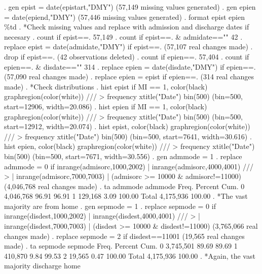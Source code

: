 . gen epist = date(epistart,"DMY")
(57,149 missing values generated)
{\smallskip}
. gen epien = date(epiend,"DMY")
(57,446 missing values generated)
{\smallskip}
. format epist epien \%td
{\smallskip}
. *Check missing values and replace with admission and discharge dates if necesary
. count if epist==.
  57,149
{\smallskip}
. count if epist==. \& admidate==""
  42
{\smallskip}
. replace epist = date(admidate,"DMY") if epist==.
(57,107 real changes made)
{\smallskip}
. drop if epist==.
(42 observations deleted)
{\smallskip}
. count if epien==.
  57,404
{\smallskip}
. count if epien==. \& disdate==""
  314
{\smallskip}
. replace epien = date(disdate,"DMY") if epien==.
(57,090 real changes made)
{\smallskip}
. replace epien = epist if epien==.
(314 real changes made)
{\smallskip}
. *Check distributions
. hist epist if MI == 1, color(black) graphregion(color(white)) ///
> frequency xtitle("Date") bin(500)
(bin=500, start=12906, width=20.086)
{\smallskip}
. hist epien if MI == 1, color(black) graphregion(color(white)) ///
> frequency xtitle("Date") bin(500)
(bin=500, start=12912, width=20.074)
{\smallskip}
. hist epist, color(black) graphregion(color(white)) ///
> frequency xtitle("Date") bin(500)
(bin=500, start=7641, width=30.616)
{\smallskip}
. hist epien, color(black) graphregion(color(white)) ///
> frequency xtitle("Date") bin(500)
(bin=500, start=7671, width=30.556)
{\smallskip}
. gen admmode = 1
{\smallskip}
. replace admmode = 0 if inrange(admisorc,1000,2002) | inrange(admisorc,4000,4001) ///
>  | inrange(admisorc,7000,7003) | (admisorc >= 10000 \& admisorc!=11000)
(4,046,768 real changes made)
{\smallskip}
. ta admmode
{\smallskip}
    admmode {\VBAR}      Freq.     Percent        Cum.
          0 {\VBAR}  4,046,768       96.91       96.91
          1 {\VBAR}    129,168        3.09      100.00
      Total {\VBAR}  4,175,936      100.00
{\smallskip}
. *The vast majority are from home
. gen sepmode = 1
{\smallskip}
. replace sepmode = 0 if inrange(disdest,1000,2002) | inrange(disdest,4000,4001) ///
>  | inrange(disdest,7000,7003) | (disdest >= 10000 \& disdest!=11000)
(3,765,066 real changes made)
{\smallskip}
. replace sepmode = 2 if disdest==11001
(19,565 real changes made)
{\smallskip}
. ta sepmode
{\smallskip}
    sepmode {\VBAR}      Freq.     Percent        Cum.
          0 {\VBAR}  3,745,501       89.69       89.69
          1 {\VBAR}    410,870        9.84       99.53
          2 {\VBAR}     19,565        0.47      100.00
      Total {\VBAR}  4,175,936      100.00
{\smallskip}
. *Again, the vast majority discharge home
